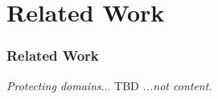 \section{Related Work}
\begin{frame}
\frametitle{Related Work}
\textit{Protecting domains}...
\newline
TBD
\newline
\newline
\textit{...not content.}
\end{frame}